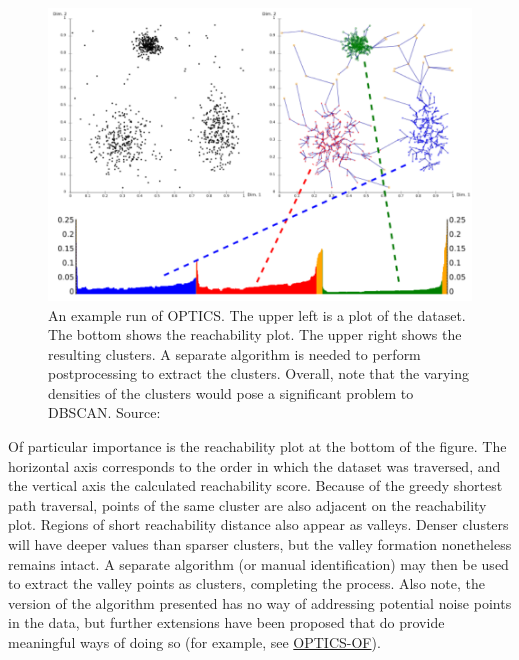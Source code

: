 \begin{figure}[h]
\centering
\includegraphics[scale=0.36]{chapter_2/files/optics_run.png}
\caption{An example run of OPTICS. The upper left is a plot of the dataset. The bottom shows the reachability plot. The upper right shows the resulting clusters. A separate algorithm is needed to perform postprocessing to extract the clusters. Overall, note that the varying densities of the clusters would pose a significant problem to DBSCAN. Source: \cite{wiki:optics}}
\label{fig:optics_plot}
\end{figure}

Of particular importance is the reachability plot at the bottom of the figure. The horizontal axis corresponds to the order in which the dataset was traversed, and the vertical axis the calculated reachability score. Because of the greedy shortest path traversal, points of the same cluster are also adjacent on the reachability plot. Regions of short reachability distance also appear as valleys. Denser clusters will have deeper values than sparser clusters, but the valley formation nonetheless remains intact. A separate algorithm (or manual identification) may then be used to extract the valley points as clusters, completing the process. Also note, the version of the algorithm presented has no way of addressing potential noise points in the data, but further extensions have been proposed that do provide meaningful ways of doing so (for example, see \href{https://link.springer.com/content/pdf/10.1007\%2F978-3-540-48247-5_28.pdf}{OPTICS-OF}).